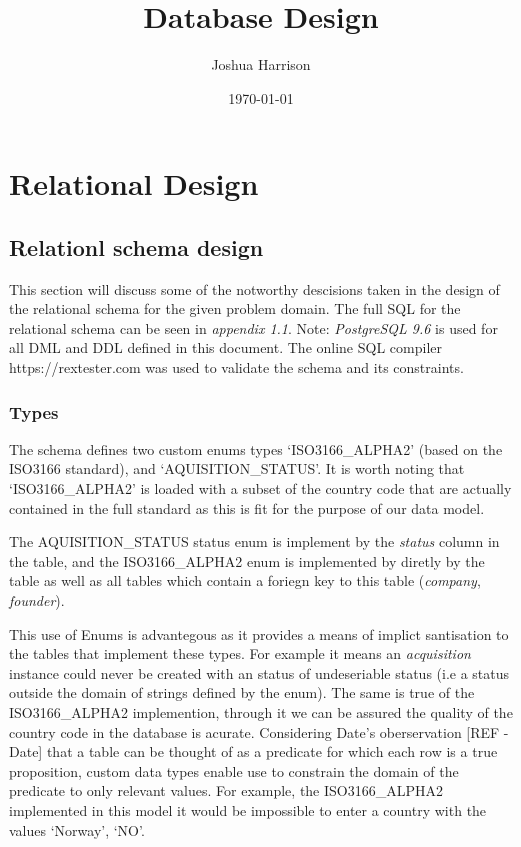 \documentclass[12pt]{article}
\title{Database Design}
\author{Joshua Harrison}
\date{\today}
\begin{document}
\maketitle

\section{Relational Design}

\subsection{Relationl schema design}
This section will discuss some of the notworthy descisions taken in the design of the relational schema for the given problem domain.
The full SQL for the relational schema can be seen in \emph{appendix 1.1}. Note: \emph{PostgreSQL 9.6} is used for all DML and DDL defined in this document. The online SQL compiler https://rextester.com was used to validate the schema and its constraints.

\subsubsection{Types}
The schema defines two custom enums types  `ISO3166\_ALPHA2' (based on the ISO3166 standard), and `AQUISITION\_STATUS'. It is worth noting that `ISO3166\_ALPHA2' is loaded with a subset of the country code that are actually contained in the full standard as this is fit for the purpose of our data model.

The AQUISITION\_STATUS status enum is implement by the \emph{status} column in the  table, and the ISO3166\_ALPHA2 enum is implemented by diretly by the  table as well as all tables which contain a foriegn key to this table (\emph{company}, \emph{founder}).

This use of Enums is advantegous as it provides a means of implict santisation to the tables that implement these types. For example it means an \emph{acquisition} instance could never be created with an status of undeseriable status (i.e a status outside the domain of strings defined by the enum). The same is true of the ISO3166\_ALPHA2 implemention, through it we can be assured the quality of the country code in the database is acurate. Considering Date's  oberservation [REF - Date] that a table can be thought of as a predicate for which each row is a true proposition, custom data types enable use to constrain the domain of the predicate to only relevant values. For example, the ISO3166\_ALPHA2 implemented in this model it would be impossible to enter a country with the values `Norway', `NO'.
\end{document}

